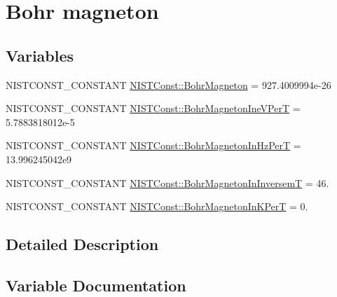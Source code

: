 \hypertarget{group___n_i_s_t_const-_bohr_magneton}{}\section{Bohr magneton}
\label{group___n_i_s_t_const-_bohr_magneton}
\subsection*{Variables}
\begin{DoxyCompactItemize}
\item 
N\+I\+S\+T\+C\+O\+N\+S\+T\+\_\+\+C\+O\+N\+S\+T\+A\+NT \mbox{\hyperlink{group___n_i_s_t_const-_bohr_magneton_ga2804e91f010b40a5c11a46506e6c1926}{N\+I\+S\+T\+Const\+::\+Bohr\+Magneton}} = 927.\+4009994e-\/26
\item 
N\+I\+S\+T\+C\+O\+N\+S\+T\+\_\+\+C\+O\+N\+S\+T\+A\+NT \mbox{\hyperlink{group___n_i_s_t_const-_bohr_magneton_ga5a7384205d0127ffe031897a6b0c3dca}{N\+I\+S\+T\+Const\+::\+Bohr\+Magneton\+Ine\+V\+PerT}} = 5.\+7883818012e-\/5
\item 
N\+I\+S\+T\+C\+O\+N\+S\+T\+\_\+\+C\+O\+N\+S\+T\+A\+NT \mbox{\hyperlink{group___n_i_s_t_const-_bohr_magneton_gaa57dcf7dffc991b2b8ab1009687691e8}{N\+I\+S\+T\+Const\+::\+Bohr\+Magneton\+In\+Hz\+PerT}} = 13.\+996245042e9
\item 
N\+I\+S\+T\+C\+O\+N\+S\+T\+\_\+\+C\+O\+N\+S\+T\+A\+NT \mbox{\hyperlink{group___n_i_s_t_const-_bohr_magneton_ga4ad979b4ddb4aeebcbff236726fa64ec}{N\+I\+S\+T\+Const\+::\+Bohr\+Magneton\+In\+InversemT}} = 46.
\item 
N\+I\+S\+T\+C\+O\+N\+S\+T\+\_\+\+C\+O\+N\+S\+T\+A\+NT \mbox{\hyperlink{group___n_i_s_t_const-_bohr_magneton_gab847d7f91c3980277d352fd100d904f2}{N\+I\+S\+T\+Const\+::\+Bohr\+Magneton\+In\+K\+PerT}} = 0.
\end{DoxyCompactItemize}


\subsection{Detailed Description}


\subsection{Variable Documentation}
\mbox{\label{group___n_i_s_t_const-_bohr_magneton_ga2804e91f010b40a5c11a46506e6c1926}} 
